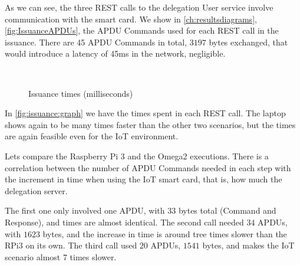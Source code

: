 As we can see, the three REST calls to the delegation User service involve communication with the smart card. We show in \autoref{ch:resultsdiagrams}, \autoref{fig:IssuanceAPDUs}, the APDU Commands used for each REST call in the issuance.
There are 45 APDU Commands in total, $3197$ bytes exchanged, that would introduce a latency of 45ms in the network, negligible.


\begin{figure}[bth]
	\myfloatalign
	 \quad
	 \\
	\caption{Issuance times (milliseconds)}
	\label{fig:issuance:graph}
\end{figure}

In \autoref{fig:issuance:graph} we have the times spent in each REST call. The laptop shows again to be many times faster than the other two scenarios, but the times are again feasible even for the IoT environment.

Lets compare the Raspberry Pi 3 and the Omega2 executions. There is a correlation between the number of APDU Commands needed in each step with the increment in time when using the IoT smart card, that is, how much the delegation server.

The first one only involved one APDU, with $33$ bytes total (Command and Response), and times are almost identical. The second call needed $34$ APDUs, with $1623$ bytes, and the increase in time is around tree times slower than the RPi3 on its own. The third call used $20$ APDUs, $1541$ bytes, and makes the IoT scenario almost 7 times slower.


